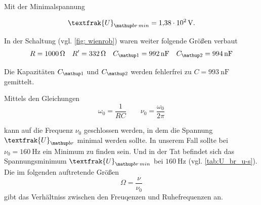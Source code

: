 Mit der Minimalspannung

\begin{equation*}
\textfrak{U}\ua{br\,min}=\SI{1.38e2}{\volt}.
\end{equation*}

In der Schaltung (vgl. \ref{fig: wienrob}) waren weiter folgende Größen verbaut
\begin{equation*}
R=\SI{1000}{\ohm} \quad R'=\SI{332}{\ohm} \quad C\ua{1}=\SI{992}{\nano\farad} \quad C\ua{2}=\SI{994}{\nano\farad}
\end{equation*}

Die Kapazitäten $C\ua{1}$ und $C\ua{2}$ werden fehlerfrei zu $C=\SI{993}{\nano\farad}$ gemittelt.

Mittels den Gleichungen 
\begin{equation*}
\omega_{0}=\frac{1}{RC} \qquad \nu_{0}=\frac{\omega_0}{2\pi}
\end{equation*}

kann auf die Frequenz $\nu_{0}$ geschlossen werden, in dem die 
Spannung $\textfrak{U}\ua{br}$ minimal werden sollte.
In unserem Fall sollte bei $\nu_{0}=\SI{160}{\hertz}$ ein Minimum zu finden sein.
Und in der Tat befindet sich das Spannungsminimum $\textfrak{U}\ua{br\,min}$ 
bei $\SI{160}{\hertz}$ (vgl. \ref{tab:U_br_u-s}).
Die im folgenden auftretende Größen 
\begin{equation*}
\Omega=\frac{\nu}{\nu_0}
\end{equation*}
gibt das Verhältniss zwischen den Freuqenzen und Ruhefrequenzen an.

